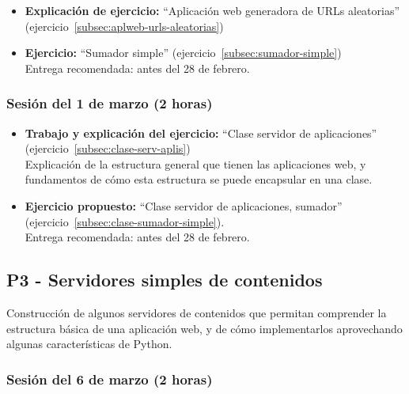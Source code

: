\documentclass[a4paper,12pt]{article}
\begin{document}
\begin{itemize}
 \item \textbf{Explicación de ejercicio:} ``Aplicación web generadora de URLs aleatorias'' (ejercicio~\ref{subsec:aplweb-urls-aleatorias})
 \item \textbf{Ejercicio:} ``Sumador simple'' (ejercicio~\ref{subsec:sumador-simple}) \\
  Entrega recomendada: antes del 28 de febrero.
\end{itemize}

\subsubsection{Sesión del 1 de marzo (2 horas)}

\begin{itemize}
\item \textbf{Trabajo y explicación del ejercicio:} ``Clase servidor de aplicaciones'' (ejercicio~\ref{subsec:clase-serv-aplis}) \\
  Explicación de la estructura general que tienen las aplicaciones web, y fundamentos de cómo esta estructura se puede encapsular en una clase.
\item \textbf{Ejercicio propuesto:} ``Clase servidor de aplicaciones, sumador'' (ejercicio~\ref{subsec:clase-sumador-simple}). \\
  Entrega recomendada: antes del 28 de febrero.
\end{itemize}


\subsection{P3 - Servidores simples de contenidos}

Construcción de algunos servidores de contenidos que permitan comprender la estructura básica de una aplicación web, y de cómo implementarlos aprovechando algunas características de Python.

\subsubsection{Sesión del 6 de marzo (2 horas)}
\end{document}
